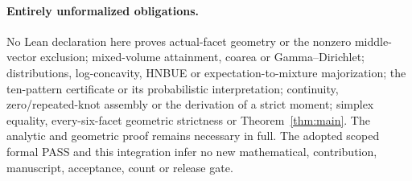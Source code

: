 \paragraph{Entirely unformalized obligations.}
No Lean declaration here proves actual-facet geometry or the nonzero
middle-vector exclusion; mixed-volume attainment, coarea or Gamma--Dirichlet;
distributions, log-concavity, HNBUE or expectation-to-mixture majorization;
the ten-pattern certificate or its probabilistic interpretation;
continuity, zero/repeated-knot assembly or the derivation of a strict moment;
simplex equality, every-six-facet geometric strictness or
Theorem~\ref{thm:main}. The analytic and geometric proof remains necessary
in full. The adopted scoped formal PASS and this integration infer no
new mathematical, contribution, manuscript, acceptance, count or release gate.
